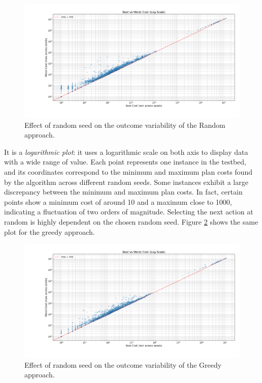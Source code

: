 \begin{figure}[h!]
	\centering
	\includegraphics[width=\textwidth]{images/randomization_random.png}
	\caption{Effect of random seed on the outcome variability of the Random approach.}
	\label{fig:rand_rand}
\end{figure}

It is a \textit{logarithmic plot}: it uses a logarithmic scale on both axis to display data with a wide range of value.
Each point represents one instance in the testbed, and its coordinates correspond to the minimum and maximum plan costs found
by the algorithm across different random seeds.
Some instances exhibit a large discrepancy between the minimum and maximum plan costs. In fact, certain points show a minimum
cost of around 10 and a maximum close to 1000, indicating a fluctuation of two orders of magnitude.
Selecting the next action at random is highly dependent on the chosen random seed.
Figure \ref{fig:rand_greedy} shows the same plot for the greedy approach.

\begin{figure}[h!]
	\centering
	\includegraphics[width=\textwidth]{images/randomization_greedy.png}
	\caption{Effect of random seed on the outcome variability of the Greedy approach.}
	\label{fig:rand_greedy}
\end{figure}

